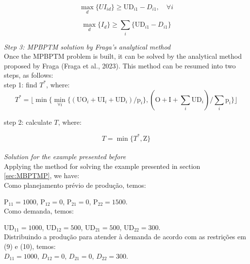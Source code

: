 \documentclass[authoryear,preprint,12pt]{elsarticle}
\begin{document}
\begin{equation}
\max_d\{UI_{id}\} \geq \textrm{UD}_{i1} - D_{i1}, \quad \forall i
\end{equation}

\begin{equation}
\max_d\{I_{d}\} \geq \sum_{i}\{ \textrm{UD}_{i1} - D_{i1} \}
\end{equation}

\emph{Step 3: MPBPTM solution by Fraga's analytical method} \\

Once the MPBPTM problem is built, it can be solved by the analytical method proposed by Fraga (Fraga et al., 2023). This method can be resumed into two steps, as follows: \\

step 1: find $T^*$, where:
\begin{equation}
T^* = \lfloor{\min \{\min_{\forall i} \{(\textrm{UO}_i + \textrm{UI}_i + \textrm{UD}_i) / \textrm{p}_i\},(\textrm{O} + \textrm{I} + \sum_i \textrm{UD}_i) / \sum_i {\textrm{p}_i}\}}\rfloor
\end{equation}

step 2: calculate $T$, where: 

\begin{equation}
T = \min \{T^* , \textrm{Z}\}
\end{equation} \\

\emph{Solution for the example presented before} \\

Applying the method for solving the example presented in section \ref{sec:MBPTMP}, we have: \\

Como planejamento prévio de produção, temos:

$\textrm{P}_{11} = 1000$,
$\textrm{P}_{12} = 0$,
$\textrm{P}_{21} = 0$,
$\textrm{P}_{22} = 1500$. \\

Como demanda, temos:

$\textrm{UD}_{11} = 1000$,
$\textrm{UD}_{12} = 500$,
$\textrm{UD}_{21} = 500$,
$\textrm{UD}_{22} = 300$. \\

Distribuindo a produção para atender à demanda de acordo com as restrições em (9) e (10), temos: \\

$D_{11} = 1000$,
$D_{12} = 0$,
$D_{21} = 0$,
$D_{22} = 300$. \\
\end{document}
